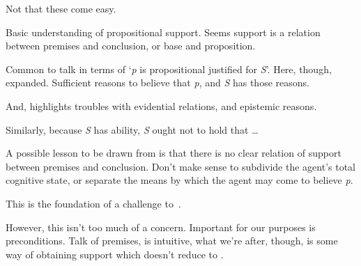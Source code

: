 \begin{note}
  Not that these come easy.

  Basic understanding of propositional support.
  Seems support is a relation between premises and conclusion, or base and proposition.

  Common to talk in terms of `\emph{p} is propositional justified for \emph{S}'.
  Here, though, expanded.
  Sufficient reasons to believe that \emph{p}, and \emph{S} has those reasons.

  And, \textcite{Silva:2020aa} highlights troubles with evidential relations, and epistemic reasons.

  Similarly, because \emph{S} has ability, \emph{S} ought not to hold that \dots
\end{note}

\begin{note}
  A possible lesson to be drawn from \citeauthor{Goldman:1979ui} is that there is no clear relation of support between premises and conclusion.
  Don't make sense to subdivide the agent's total cognitive state, or separate the means by which the agent may come to believe \emph{p}.

  This is the foundation of a challenge to~\USE{}.

  However, this isn't too much of a concern.
  Important for our purposes is preconditions.
  Talk of premises, is intuitive, what we're after, though, is some way of obtaining support which doesn't reduce to \AR{}.
\end{note}

